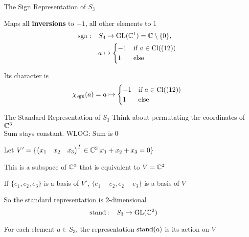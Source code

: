 \begin{frame}{The Sign Representation of $S_3$}
    \large
    
    Maps all \textbf{inversions} to $-1$, all other elements to 1
    \pause
    \begin{align*}
        \operatorname{sgn}: \quad & S_3 \to \operatorname{GL}(\mathbb{C}^1) = \mathbb{C} \setminus \{0\}, \\
        & a \mapsto \begin{cases}
            -1 & \text{if } a \in \operatorname{Cl}((12)) \\
            1 & \text{else}
        \end{cases}
    \end{align*}

    \pause
    Its character is
    \begin{align*}
        \chi_{\operatorname{sgn}}(a) = a \mapsto \begin{cases}
            -1 & \text{if } a \in \operatorname{Cl}((12)) \\
            1 & \text{else}
        \end{cases}
    \end{align*}
\end{frame}

\begin{frame}{The Standard Representation of $S_3$}
    \large
    Think about permutating the coordinates of $\mathbb{C}^3$ \pause \\
    Sum stays constant. \pause WLOG: Sum is 0 \pause

    Let $V' = \{\begin{pmatrix}
        x_1 & x_2 & x_3
    \end{pmatrix}^T \in \mathbb{C}^3 | x_1 + x_2 + x_3 = 0\}$
    
    \pause
    \vspace{1em}
    This is a subspace of $\mathbb{C}^3$ that is equivalent to $V = \mathbb{C}^2$

    \pause
    If $\{e_1, e_2, e_3\}$ is a basis of $V'$,
    $\{e_1 - e_2, e_2 - e_3\}$ is a basis of $V$
    
    \pause
    \vspace{1em}
    So the standard representation is 2-dimensional
    \begin{align*}
        \operatorname{stand}: \quad & S_3 \to \operatorname{GL}(\mathbb{C}^2)
    \end{align*}
    
    \pause
    For each element $a \in S_3$, the representation $\operatorname{stand}(a)$ is its action on $V$
\end{frame}

